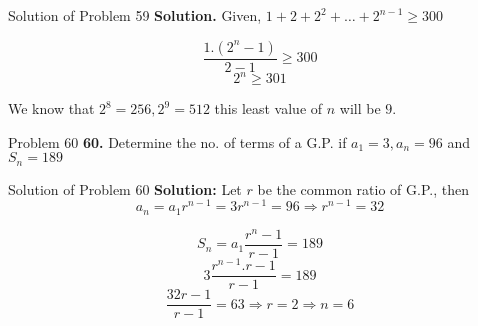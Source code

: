 \documentclass[aspectratio=1610,8pt]{beamer}
\begin{document}
\begin{frame}{Solution of Problem 59}
  \textbf{Solution.} Given, $1 + 2 + 2^2 + \ldots + 2^{n - 1} \geq 300$

  $$\frac{1.(2^n - 1)}{2 - 1}\geq 300$$
  $$2^n \geq 301$$

  We know that $2^8 = 256, 2^9 = 512$ this least value of $n$ will be $9.$
\end{frame}
\begin{frame}{Problem 60}
  \textbf{60.} Determine the no. of terms of a G.P. if $a_1 = 3, a_n = 96$ and $S_n = 189$
\end{frame}
\begin{frame}{Solution of Problem 60}
  \textbf{Solution:} Let $r$ be the common ratio of G.P., then
  $$a_n = a_1r^{n - 1} = 3r^{n - 1} = 96 \Rightarrow r^{n - 1} = 32$$

  $$S_n = a_1\frac{r^n - 1}{r - 1} = 189$$
  $$3\frac{r^{n - 1}.r - 1}{r - 1} = 189$$
  $$\frac{32r - 1}{r - 1} = 63 \Rightarrow r = 2 \Rightarrow n = 6$$
\end{frame}
\end{document}
